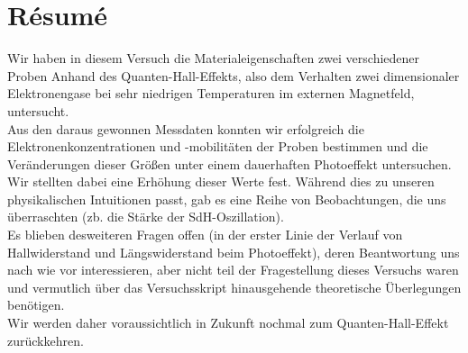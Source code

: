 \section{R\'esum\'e}
Wir haben in diesem Versuch die Materialeigenschaften zwei verschiedener Proben Anhand des Quanten-Hall-Effekts, also dem Verhalten zwei dimensionaler Elektronengase bei sehr niedrigen Temperaturen im externen Magnetfeld, untersucht. \\

Aus den daraus gewonnen Messdaten konnten wir erfolgreich die Elektronenkonzentrationen und -mobilitäten der Proben bestimmen und die Veränderungen dieser Größen unter einem dauerhaften Photoeffekt untersuchen. Wir stellten dabei eine Erhöhung dieser Werte fest. 
Während dies zu unseren physikalischen Intuitionen passt, gab es eine Reihe von Beobachtungen, die uns überraschten (zb. die Stärke der SdH-Oszillation). \\

Es blieben desweiteren Fragen offen (in der erster Linie der Verlauf von Hallwiderstand und Längswiderstand beim Photoeffekt), deren Beantwortung uns nach wie vor interessieren, aber nicht teil der Fragestellung dieses Versuchs waren und vermutlich über das Versuchsskript hinausgehende theoretische Überlegungen benötigen.\\

Wir werden daher voraussichtlich in Zukunft nochmal zum Quanten-Hall-Effekt zurückkehren. 
